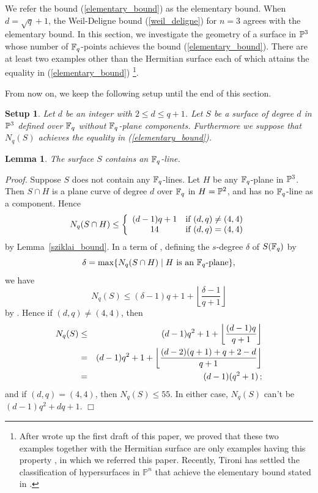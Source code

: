 \documentclass[a4paper,11pt]{article}
\newtheorem{lemma}[theorem]{Lemma}
\newtheorem{setup}[theorem]{Setup}
\newcommand{\proof}{\noindent \mbox{\em Proof.\hspace*{2mm}}}
\newcommand{\qed}{\hfill \mbox{$  \Box $}}
\begin{document}
We refer the bound (\ref{elementary_bound})
as the elementary bound.
When $d=\sqrt{q}+1$,
the Weil-Deligne bound (\ref{weil_deligne}) for $n=3$ agrees with
the elementary bound.
In this section,
we investigate the geometry of a surface in ${\Bbb P}^3$
whose number of ${\Bbb F}_q$-points achieves the bound
(\ref{elementary_bound}).
There are at least two examples other than the Hermitian surface
each of which attains the equality in (\ref{elementary_bound})
\footnote{
After wrote up the first draft of this paper,
we proved that these two examples together with
the Hermitian surface are only examples having this property
\cite{hom-kim2015a},
in which we referred this paper.
Recently, Tironi \cite{tir2014preprint} has settled
the classification of hypersurfaces in $\mathbb{P}^n$
that achieve the elementary bound stated in \cite{hom-kim2013}.
}.

From now on, we keep the following setup
until the end of this section.

%
\begin{setup}
Let $d$ be an integer with $2\leq d \leq q+1$.
Let $S$ be a surface of degree $d$ in ${\Bbb P}^3$
defined over ${\Bbb F}_q$
without ${\Bbb F}_q$-plane components.
Furthermore we suppose that $N_q(S)$
achieves the equality in (\ref{elementary_bound}).
\end{setup}
%
\begin{lemma}\label{contains_line}
The surface $S$ contains an ${\Bbb F}_q$-line.
\end{lemma}
\proof
Suppose $S$ does not contain any ${\Bbb F}_q$-lines.
Let $H$ be any ${\Bbb F}_q$-plane in ${\Bbb P}^3$.
Then $S\cap H$ is a plane curve of degree $d$ over ${\Bbb F}_q$
in $H = {\Bbb P}^2$, and has no ${\Bbb F}_q$-line as a component.
Hence
\begin{equation}
 N_q(S\cap H) \leq
  \left\{
      \begin{array}{cl}
       (d-1)q +1 & \mbox{\rm if $(d,q) \neq (4,4)$}\\
       14        & \mbox{\rm if $(d,q) = (4,4)$}
      \end{array}
  \right.
\end{equation}
by Lemma~\ref{sziklai_bound}.
In a term of \cite{hom2012},
defining the $s$-degree $\delta$ of $S({\Bbb F}_q)$ by
\[
\delta = \max \{ N_q(S\cap H) \mid \mbox{\rm $H$ is an ${\Bbb F}_q$-plane} \}, 
\]
we have
\[
N_q(S) \leq (\delta -1)q + 1 +
\left\lfloor
\frac{\delta -1}{q +1}
     \right\rfloor
\]
by \cite[Proposition 2.2]{hom2012}.
Hence if $(d,q) \neq (4,4)$, then
\begin{eqnarray*}
 N_q(S) & \leq & (d-1)q^2 +1 + \left\lfloor
\frac{(d -1)q}{q +1}
     \right\rfloor\\
     &=& (d-1)q^2 +1 + \left\lfloor
\frac{(d -2)(q+1)+q+2-d}{q +1}
     \right\rfloor\\
     &=& (d-1)(q^2+1) \, {\rm ;}
\end{eqnarray*}
and if $(d,q) = (4,4)$, then $N_q(S) \leq 55$.
In either case, $N_q(S)$ can't be
$(d-1)q^2 + dq +1.$
\qed
\end{document}
